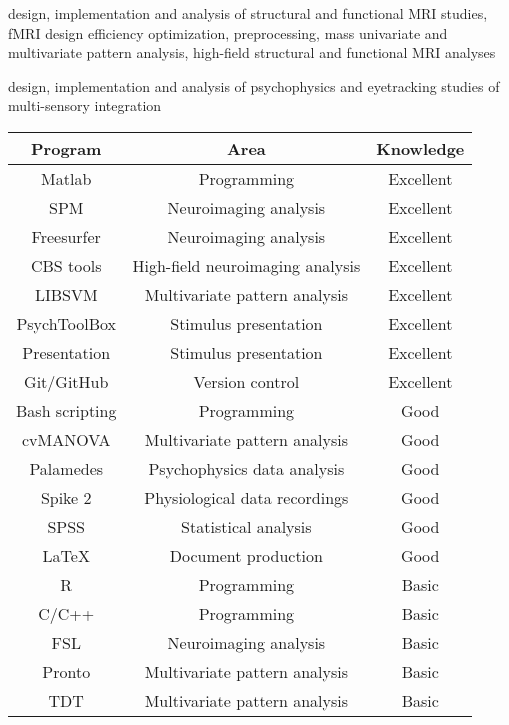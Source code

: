  design, implementation and analysis of structural and functional MRI studies, fMRI design efficiency optimization, preprocessing, mass univariate and multivariate pattern analysis, high-field structural and functional MRI analyses

 design, implementation and analysis of psychophysics and eyetracking studies of multi-sensory integration 



\begin{center}
\begin{tabular}[c]{|c|c|c|}
\hline\hline
Program         & Area                              & Knowledge \\
\hline
Matlab          & Programming                       & Excellent \\ 
SPM             & Neuroimaging analysis             & Excellent \\
Freesurfer      & Neuroimaging analysis             & Excellent \\
CBS tools       & High-field neuroimaging analysis  & Excellent \\
LIBSVM          & Multivariate pattern analysis     & Excellent \\
PsychToolBox    & Stimulus presentation             & Excellent \\
Presentation    & Stimulus presentation             & Excellent \\
Git/GitHub      & Version control                   & Excellent \\
Bash scripting  & Programming                       & Good \\
cvMANOVA        & Multivariate pattern analysis     & Good \\
Palamedes       & Psychophysics data analysis       & Good \\
Spike 2         & Physiological data recordings     & Good \\
SPSS            & Statistical analysis              & Good \\
\LaTeX          & Document production               & Good \\
R               & Programming                       & Basic \\
C/C++           & Programming                       & Basic \\
FSL             & Neuroimaging analysis             & Basic \\
Pronto          & Multivariate pattern analysis     & Basic \\
TDT             & Multivariate pattern analysis     & Basic \\
\hline\hline
\end{tabular} 
\end{center}

